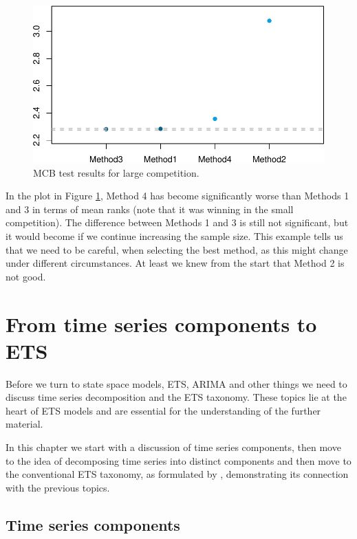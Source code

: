 \documentclass[
]{book}
\theoremstyle{definition}
\theoremstyle{definition}
\theoremstyle{definition}
\theoremstyle{definition}
\theoremstyle{remark}
\begin{document}
\begin{figure}
\centering
\includegraphics{adam_files/figure-latex/mcbForCompetitionLarge-1.pdf}
\caption{\label{fig:mcbForCompetitionLarge}MCB test results for large competition.}
\end{figure}

In the plot in Figure \ref{fig:mcbForCompetitionLarge}, Method 4 has become significantly worse than Methods 1 and 3 in terms of mean ranks (note that it was winning in the small competition). The difference between Methods 1 and 3 is still not significant, but it would become if we continue increasing the sample size. This example tells us that we need to be careful, when selecting the best method, as this might change under different circumstances. At least we knew from the start that Method 2 is not good.

\hypertarget{tsDecomposition}{%
\chapter{From time series components to ETS}\label{tsDecomposition}}

Before we turn to state space models, ETS, ARIMA and other things we need to discuss time series decomposition and the ETS taxonomy. These topics lie at the heart of ETS models and are essential for the understanding of the further material.

In this chapter we start with a discussion of time series components, then move to the idea of decomposing time series into distinct components and then move to the conventional ETS taxonomy, as formulated by \citet{Hyndman2008b}, demonstrating its connection with the previous topics.

\hypertarget{tsComponents}{%
\section{Time series components}\label{tsComponents}}
\end{document}
